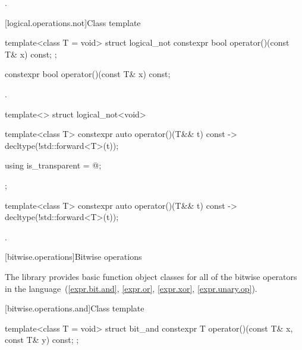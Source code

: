\begin{itemdescr}
\pnum
\returns
{}.
\end{itemdescr}

[logical.operations.not]{Class template }

\begin{indexed}{
%
}
\begin{itemdecl}
template<class T = void> struct logical_not {
  constexpr bool operator()(const T& x) const;
};
\end{itemdecl}
\end{indexed}

%
\begin{itemdecl}
constexpr bool operator()(const T& x) const;
\end{itemdecl}

\begin{itemdescr}
\pnum
\returns
{}.
\end{itemdescr}

%
\begin{itemdecl}
template<> struct logical_not<void> {
  template<class T> constexpr auto operator()(T&& t) const
    -> decltype(!std::forward<T>(t));

  using is_transparent = @\unspec@;
};
\end{itemdecl}

%
\begin{itemdecl}
template<class T> constexpr auto operator()(T&& t) const
    -> decltype(!std::forward<T>(t));
\end{itemdecl}

\begin{itemdescr}
\pnum
\returns
{}.
\end{itemdescr}


[bitwise.operations]{Bitwise operations}

\pnum
The library provides basic function object classes for all of the bitwise
operators in the language~(\ref{expr.bit.and}, \ref{expr.or},
\ref{expr.xor}, \ref{expr.unary.op}).

[bitwise.operations.and]{Class template }

\begin{indexed}{
%
}
\begin{itemdecl}
template<class T = void> struct bit_and {
  constexpr T operator()(const T& x, const T& y) const;
};
\end{itemdecl}
\end{indexed}

